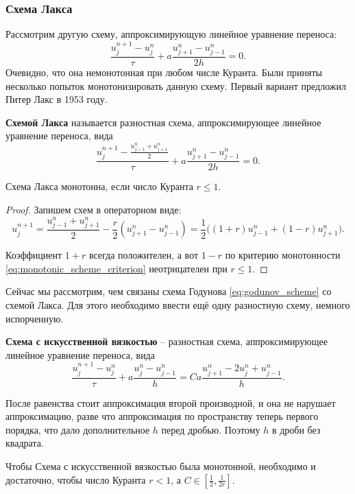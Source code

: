 \documentclass{article}
\begin{document}
\subsubsection{Схема Лакса}

Рассмотрим другую схему, аппроксимирующую линейное уравнение переноса:
\[\frac{u_j^{n+1}-u_j^n}{\tau}+a\frac{u_{j+1}^n-u_{j-1}^n}{2h}=0.\]
Очевидно, что она немонотонная при любом числе Куранта. Были приняты несколько
попыток монотонизировать данную схему. Первый вариант предложил Питер Лакс в
1953 году.

\begin{define}\label{eq:lax_scheme}
	\textbf{Схемой Лакса} называется разностная схема, аппроксимирующее
	линейное уравнение переноса, вида
	\[\frac{u_j^{n+1}-\frac{u_{j-1}^n+u_{j+1}^n}{2}}{\tau}+
	a\frac{u_{j+1}^n-u_{j-1}^n}{2h}=0.\]
\end{define}

\begin{lemma}
	Схема Лакса монотонна, если число Куранта $r\le 1$.
\end{lemma}

\begin{proof}
	Запишем схем в операторном виде:
	\[u_j^{n+1}=\frac{u_{j-1}^n+u_{j+1}^n}{2}-
	\frac{r}{2}(u_{j+1}^n-u_{j-1}^n)=
	\frac{1}{2}\big((1+r)u_{j-1}^n+(1-r)u_{j+1}^n\big).\]

	Коэффициент $1+r$ всегда положителен, а вот $1-r$ по критерию
	монотонности \eqref{eq:monotonic_scheme_criterion} неотрицателен при
	$r\le 1$.
\end{proof}

Сейчас мы рассмотрим, чем связаны схема Годунова \eqref{eq:godunov_scheme} со
схемой Лакса. Для этого необходимо ввести ещё одну разностную схему, немного
испорченную.

\begin{define}\label{eq:god_lax_scheme}
	\textbf{Схема с искусственной вязкостью} -- разностная схема,
	аппроксимирующее линейное уравнение переноса, вида
	\[\frac{u_j^{n+1}-u_j^n}{\tau}+a\frac{u_j^n-u_{j-1}^n}{h}=
	Ca\frac{u_{j+1}^n-2u_j^n+u_{j-1}^n}{h}.\]
\end{define}

После равенства стоит аппроксимация второй производной, и она не нарушает
аппроксимацию, разве что аппроксимация по пространству теперь первого порядка,
что дало дополнительное $h$ перед дробью. Поэтому $h$ в дроби без квадрата.

\begin{lemma}
	Чтобы Схема с искусственной вязкостью была монотонной, необходимо
	и достаточно, чтобы число Куранта $r<1$, а
	$C\in[\frac{1}{2},\frac{1}{2r}]$.
\end{lemma}
\end{document}
